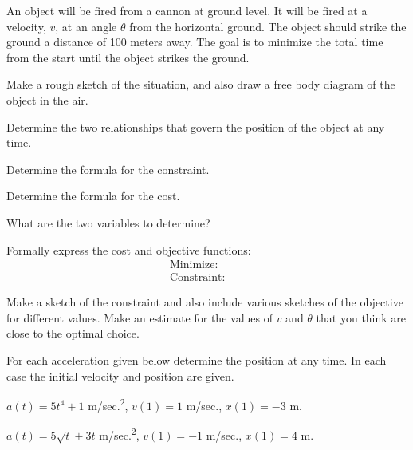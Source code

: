 \begin{problem}
\item An object will be fired from a cannon at ground level. It will
  be fired at a velocity, $v$, at an angle $\theta$ from the
  horizontal ground.  The object should strike the ground a distance
  of 100 meters away. The goal is to minimize the total time from the
  start until the object strikes the ground.
  \begin{subproblem}
  \item Make a rough sketch of the situation, and also draw a free
    body diagram of the object in the air.
    \vfill
  \item Determine the two relationships that govern the position of
    the object at any time.
    \vfill
  \item Determine the formula for the constraint.
    \vfill
  \item Determine the formula for the cost.
    \vfill

    \clearpage

  \item What are the two variables to determine?
    \vspace{2em}

  \item Formally express the cost and objective functions:
    \begin{eqnarray*}
      \mathrm{Minimize:} & &  \\
      \mathrm{Constraint:} & &
    \end{eqnarray*}


  \item Make a sketch of the constraint and also include various
    sketches of the objective for different values. Make an estimate
    for the values of $v$ and $\theta$ that you think are close to the
    optimal choice.

    \vfill

  \item

  \end{subproblem}

\end{problem}




\begin{problem}
\item For each acceleration given below determine the position at any
  time. In each case the initial velocity and position are given.
  \begin{subproblem}
  \item $a(t)=5t^4+1$ m/sec.\textsuperscript{2}, $v(1)=1$ m/sec.,
    $x(1)=-3$ m.
    \vfill
  \item $a(t)=5\sqrt{t}+3t$ m/sec.\textsuperscript{2}, $v(1)=-1$ m/sec.,
    $x(1)=4$ m.
    \vfill
  \end{subproblem}
\end{problem}


